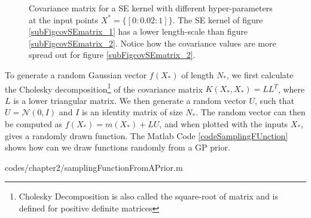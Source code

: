 \begin{figure}[!ht]
  \centering
    \quad
{}\quad
  
       \caption{Covariance matrix for a SE kernel with different hyper-parameters at the input points $X^{*} = \{[0:0.02:1]\}$. The SE kernel of figure \ref{subFigcovSEmatrix_1} has a lower length-scale than figure \ref{subFigcovSEmatrix_2}. Notice how the covariance values are more spread out for figure \ref{subFigcovSEmatrix_2}.}\label{figGPCovarianceMatrix}
\end{figure}

To generate a random Gaussian vector $f(X_{*})$ of length $N_{*}$, we first calculate the Cholesky decomposition\footnote{Cholesky Decomposition is also called the square-root of matrix and is defined for positive definite matrices} of the covariance matrix $K(X_{*}, X_{*}) = LL^{T}$, where $L$ is a lower triangular matrix. We then generate a random vector $U$, such that $U = \mathcal{N}(0, I)$ and $I$ is an identity matrix of size $N_{*}$.  The random vector can then be computed as $f(X_{*}) = m(X_{*}) + LU$, and when plotted with the inputs $X_{*}$, gives a randomly drawn function. The Matlab Code \ref{codeSamplingFUnction} shows how can we draw functions randomly from a GP prior.
\begin{mdframed}[hidealllines=true,backgroundcolor=lightgray!20]

                    {codes/chapter2/samplingFunctionFromAPrior.m}
\end{mdframed}

